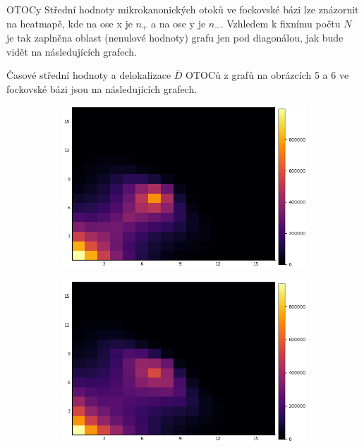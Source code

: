 \documentclass{article}
\begin{document}
\begin{section}{OTOCy}
            Střední hodnoty mikrokanonických otoků ve fockovské bázi lze znázornit na heatmapě, kde na ose x je $n_+$
            a na ose y je $n_-$. Vzhledem k fixnímu počtu $N$ je tak zaplněna oblast (nenulové hodnoty) grafu jen pod diagonálou, jak bude 
            vidět na následujících grafech.

            Časové střední hodnoty a delokalizace $\bar{D}$ OTOCů z grafů na obrázcích 5 a 6 ve fockovské bázi jsou na 
            následujících grafech.


                \begin{figure}[H]
                    \begin{subfigure}{.5\textwidth}
                      \centering
                      \includegraphics[width=1.0\linewidth]{HM0.png}
                     
                    \end{subfigure}%
                    \begin{subfigure}{.5\textwidth}
                      \centering
                      \includegraphics[width=1.0\linewidth]{HM0.03.png}
                      

\end{subfigure}
\end{figure}
\end{section}
\end{document}
